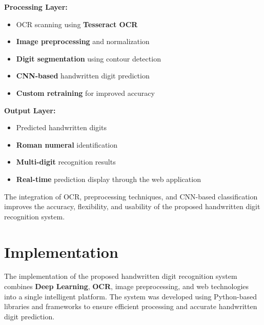 \documentclass[12pt,a4paper]{article}
\begin{document}
\vspace{0.3cm}

\noindent
\textbf{Processing Layer:}

\begin{itemize}
\item OCR scanning using \textbf{Tesseract OCR}
\item \textbf{Image preprocessing} and normalization
\item \textbf{Digit segmentation} using contour detection
\item \textbf{CNN-based} handwritten digit prediction
\item \textbf{Custom retraining} for improved accuracy
\end{itemize}

\vspace{0.3cm}

\noindent
\textbf{Output Layer:}

\begin{itemize}
\item Predicted handwritten digits
\item \textbf{Roman numeral} identification
\item \textbf{Multi-digit} recognition results
\item \textbf{Real-time} prediction display through the web application
\end{itemize}

\vspace{0.3cm}

\noindent
The integration of OCR, preprocessing techniques, and CNN-based classification improves the accuracy, flexibility, and usability of the proposed handwritten digit recognition system.

\newpage

\section{Implementation}

\vspace{0.3cm}

\noindent
The implementation of the proposed handwritten digit recognition system combines \textbf{Deep Learning}, \textbf{OCR}, image preprocessing, and web technologies into a single intelligent platform. The system was developed using Python-based libraries and frameworks to ensure efficient processing and accurate handwritten digit prediction.

\vspace{0.4cm}
\end{document}
